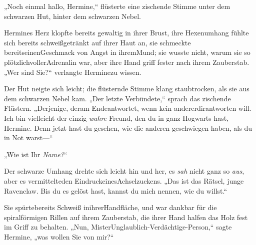 „Noch einmal hallo, Hermine,“ flüsterte eine zischende Stimme unter dem schwarzen Hut, hinter dem schwarzen Nebel.

Hermines Herz klopfte bereits gewaltig in ihrer Brust, ihre Hexenumhang fühlte sich bereits schweißgetränkt auf ihrer Haut an, sie schmeckte bereitseinenGeschmack von Angst in ihremMund; sie wusste nicht, warum sie so plötzlichvollerAdrenalin war, aber ihre Hand griff fester nach ihrem Zauberstab. „Wer sind Sie?“ verlangte Herminezu wissen.

Der Hut neigte sich leicht; die flüsternde Stimme klang staubtrocken, als sie aus dem schwarzen Nebel kam. „Der letzte Verbündete,“ sprach das zischende Flüstern. „Derjenige, deram Endeantwortet, wenn kein andererdirantworten will. Ich bin vielleicht der einzig \emph{wahre} Freund, den du in ganz Hogwarts hast, Hermine. Denn jetzt hast du gesehen, wie die anderen geschwiegen haben, als du in Not warst—“

„Wie ist Ihr \emph{Name?}“

Der schwarze Umhang drehte sich leicht hin und her, es \emph{sah} nicht ganz so \emph{aus}, aber es vermittelteden EindruckeinesAchselzuckens. „Das ist das Rätsel, junge Ravenclaw. Bis du es gelöst hast, kannst du mich nennen, wie du willst.“

Sie spürtebereits Schweiß inihrerHandfläche, und war dankbar für die spiralförmigen Rillen auf ihrem Zauberstab, die ihrer Hand halfen das Holz fest im Griff zu behalten. „Nun, MisterUnglaublich-Verdächtige-Person,“ sagte Hermine, „was wollen Sie von mir?“

